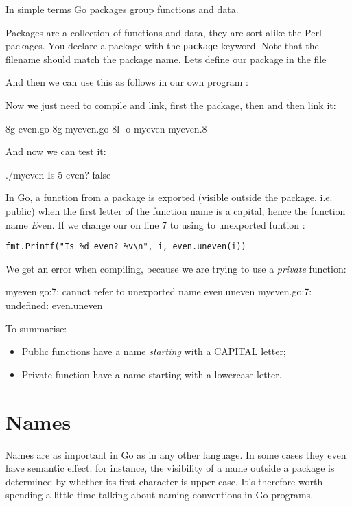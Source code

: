 \noindent

In simple terms Go packages group functions and data.

Packages are a collection of functions and data, they are sort alike the
Perl packages\cite{perl-packages}. You declare a package with the
\lstinline{package} keyword. Note that the filename should
match the package name. Lets define our package  in the file


And then we can use this as follows in our own program :


Now we just need to compile and link, first the package, then  and
then link it:
\begin{display}
\pr 8g even.go			\qquad\qquad{}
\pr 8g myeven.go		\qquad\qquad{}
\pr 8l -o myeven myeven.8
\end{display}
And now we can test it:
\begin{display}
\pr ./myeven
Is 5 even? false
\end{display}

In Go, a function from a package is exported (visible
outside the package, i.e. public) when the first letter of the function name is a capital, hence
the function name \emph{E}ven. If we change our  on line
7 to using to unexported funtion :

\noindent\lstinline{fmt.Printf("Is %d even? %v\n", i, even.uneven(i))}

\noindent We get an error when compiling, because we are trying to use a
\emph{private} function:
\begin{display}
myeven.go:7: cannot refer to unexported name even.uneven
myeven.go:7: undefined: even.uneven
\end{display}
To summarise:
\begin{itemize}
\item Public functions have a name \emph{starting} with a CAPITAL
letter;
\item Private function have a name starting with a lowercase letter.
\end{itemize}

\section{Names}
Names are as important in Go as in any other language. In some cases
they even have semantic effect: for instance, the visibility of a name
outside a package is determined by whether its first character is upper
case. It's therefore worth spending a little time talking about naming
conventions in Go programs.

